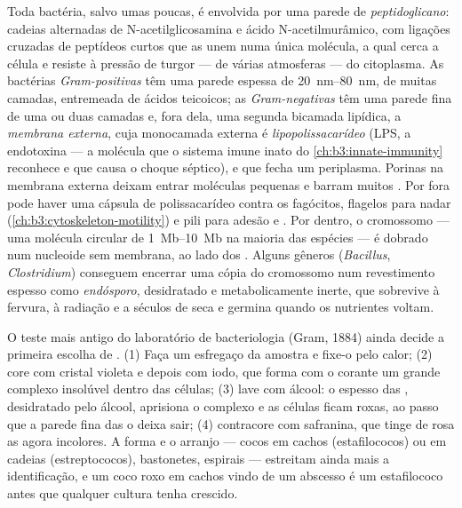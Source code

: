 \begin{definition}[O envoltório]\label{def:b3:bacteriology:envelope}
Toda bactéria, salvo umas poucas, é envolvida por uma parede de
\emph{peptidoglicano}: cadeias alternadas de N-acetilglicosamina e
ácido N-acetilmurâmico, com ligações cruzadas de peptídeos curtos que
as unem numa única molécula, a qual cerca a célula e resiste à pressão
de turgor --- de várias atmosferas --- do citoplasma. As bactérias
\emph{Gram-positivas} têm uma parede espessa de
\qtyrange{20}{80}{nm}, de muitas camadas, entremeada de ácidos
teicoicos; as \emph{Gram-negativas} têm uma parede fina de uma ou duas
camadas e, fora dela, uma segunda bicamada lipídica, a \emph{membrana
externa}, cuja monocamada externa é \emph{lipopolissacarídeo} (LPS, a
endotoxina --- a molécula que o sistema imune inato do
\cref{ch:b3:innate-immunity} reconhece e que causa o choque séptico), e
que fecha um periplasma. Porinas na membrana externa deixam entrar
moléculas pequenas e barram muitos . Por fora pode haver
uma cápsula de polissacarídeo contra os fagócitos, flagelos para nadar
(\cref{ch:b3:cytoskeleton-motility}) e pili para adesão e .
Por dentro, o cromossomo --- uma molécula circular de
\qtyrange{1}{10}{Mb} na maioria das espécies --- é dobrado num
nucleoide sem membrana, ao lado dos . Alguns gêneros
(\emph{Bacillus}, \emph{Clostridium}) conseguem encerrar uma cópia do
cromossomo num revestimento espesso como \emph{endósporo}, desidratado
e metabolicamente inerte, que sobrevive à fervura, à radiação e a
séculos de seca e germina quando os nutrientes voltam.
\end{definition}

\begin{method}\label{met:b3:bacteriology:gram}
O teste mais antigo do laboratório de bacteriologia (Gram, 1884) ainda
decide a primeira escolha de . (1) Faça um esfregaço da
amostra e fixe-o pelo calor; (2) core com cristal violeta e depois com
iodo, que forma com o corante um grande complexo insolúvel dentro das
células; (3) lave com álcool: o  espesso das
, desidratado pelo álcool, aprisiona o complexo e as
células ficam roxas, ao passo que a parede fina das  o
deixa sair; (4) contracore com safranina, que tinge de rosa as
 agora incolores. A forma e o arranjo --- cocos em cachos
(estafilococos) ou em cadeias (estreptococos), bastonetes, espirais ---
estreitam ainda mais a identificação, e um coco roxo em cachos vindo de
um abscesso é um estafilococo antes que qualquer cultura tenha
crescido.
\end{method}

